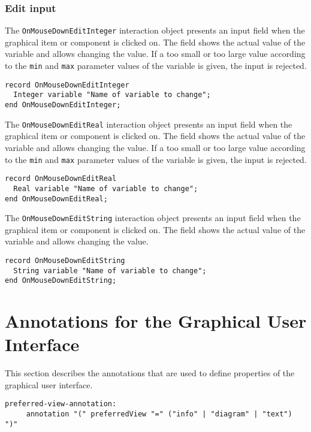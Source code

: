 \subsubsection{Edit input}\label{edit-input}

The \lstinline!OnMouseDownEditInteger! interaction object presents an input field
when the graphical item or component is clicked on. The field shows the
actual value of the variable and allows changing the value. If a too
small or too large value according to the \lstinline!min! and \lstinline!max! parameter values
of the variable is given, the input is rejected.

\begin{lstlisting}[language=modelica]
record OnMouseDownEditInteger
  Integer variable "Name of variable to change";
end OnMouseDownEditInteger;
\end{lstlisting}
The \lstinline!OnMouseDownEditReal! interaction object presents an input field when
the graphical item or component is clicked on. The field shows the
actual value of the variable and allows changing the value. If a too
small or too large value according to the \lstinline!min! and \lstinline!max! parameter values
of the variable is given, the input is rejected.

\begin{lstlisting}[language=modelica]
record OnMouseDownEditReal
  Real variable "Name of variable to change";
end OnMouseDownEditReal;
\end{lstlisting}
The \lstinline!OnMouseDownEditString! interaction object presents an input field
when the graphical item or component is clicked on. The field shows the
actual value of the variable and allows changing the value.

\begin{lstlisting}[language=modelica]
record OnMouseDownEditString
  String variable "Name of variable to change";
end OnMouseDownEditString;
\end{lstlisting}

\section{Annotations for the Graphical User Interface}\label{annotations-for-the-graphical-user-interface}
This section describes the annotations that are used to define properties of the
graphical user interface.

\begin{lstlisting}[language=grammar]
  preferred-view-annotation:
     annotation "(" preferredView "=" ("info" | "diagram" | "text") ")"
\end{lstlisting}

